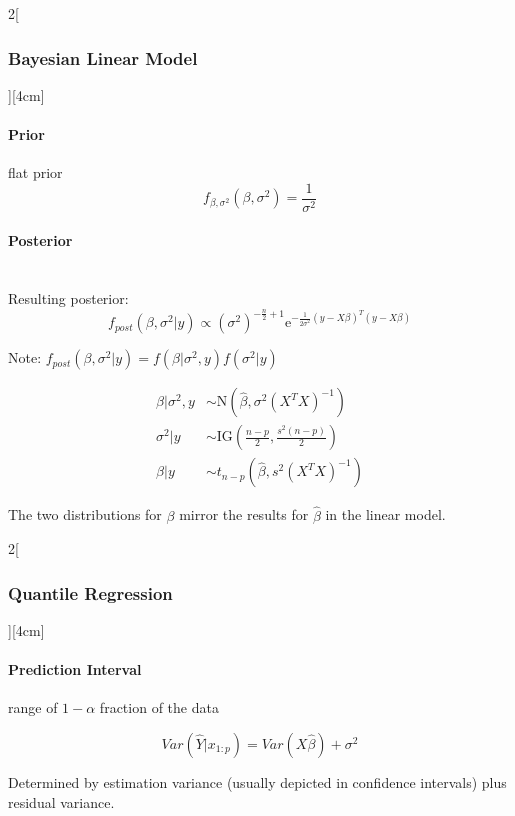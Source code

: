 \documentclass[8pt]{extarticle}
\begin{document}
\begin{multicols}{2}[\subsubsection{Bayesian Linear Model}][4cm]

\paragraph{Prior} flat prior\ \\

$$f_{\beta,\sigma^2} (\beta,\sigma^2) = \frac{1}{\sigma^2}$$

\paragraph{Posterior} \ \\

\noindent Resulting posterior: $$f_{post}(\beta,\sigma^2|y)\propto (\sigma^2)^{-\frac{n}{2}+1} \mathrm{e}^{-\frac{1}{2\sigma^2} (y{-}X\beta)^T(y{-}X\beta)}$$

Note: $f_{post}(\beta,\sigma^2|y) = f(\beta|\sigma^2,y)f(\sigma^2|y)$



\begin{align*}
\beta|\sigma^2,y &\sim \mathrm{N}\left(\hat{\beta}, \sigma^2(X^TX)^{-1}\right)\\
\sigma^2|y &\sim \mathrm{IG}\left(\frac{n-p}{2},\frac{s^2(n-p)}{2}\right)\\
\beta|y &\sim t_{n-p}\left(\hat{\beta}, s^2(X^TX)^{-1}\right)
\end{align*}
\vspace{1em}

\noindent The two distributions for $\beta$ mirror the results for $\hat{\beta}$ in the linear model. 

\end{multicols} 

\begin{multicols}{2}[\subsubsection{Quantile Regression}][4cm]

\paragraph{Prediction Interval} range of $1-\alpha$ fraction of the data

$$Var(\hat{Y}|x_{1:p}) = Var(X\hat{\beta}) + \sigma^2$$

\noindent Determined by estimation variance (usually depicted in confidence intervals) plus residual variance.


\end{multicols}
\end{document}
